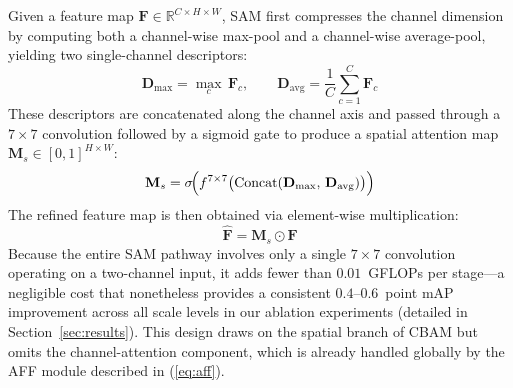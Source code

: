 Given a feature map
$\mathbf{F} \in \mathbb{R}^{C \times H \times W}$, SAM first
compresses the channel dimension by computing both a
channel-wise max-pool and a channel-wise average-pool,
yielding two single-channel descriptors:
\begin{equation}
    \mathbf{D}_{\max} = \max_{c}\, \mathbf{F}_{c},
    \qquad
    \mathbf{D}_{\text{avg}} = \frac{1}{C}
    \sum_{c=1}^{C} \mathbf{F}_{c}
    \label{eq:sam_pool}
\end{equation}
These descriptors are concatenated along the channel axis and
passed through a $7 \times 7$ convolution followed by a sigmoid
gate to produce a spatial attention map
$\mathbf{M}_{s} \in [0,1]^{H \times W}$:
\begin{equation}
    \mathbf{M}_{s} = \sigma\!\Bigl(
        f^{7 \times 7}\bigl(
            \text{Concat}(\mathbf{D}_{\max},\,
                           \mathbf{D}_{\text{avg}})
        \bigr)
    \Bigr)
    \label{eq:sam_gate}
\end{equation}
The refined feature map is then obtained via element-wise
multiplication:
\begin{equation}
    \hat{\mathbf{F}} = \mathbf{M}_{s} \odot \mathbf{F}
    \label{eq:sam_refine}
\end{equation}
Because the entire SAM pathway involves only a single
$7 \times 7$ convolution operating on a two-channel input, it
adds fewer than $0.01$~GFLOPs per stage---a negligible cost
that nonetheless provides a consistent $0.4$--$0.6$~point mAP
improvement across all scale levels in our ablation
experiments (detailed in Section~\ref{sec:results}). This
design draws on the spatial branch of CBAM
\cite{woo2018cbam} but omits the channel-attention component,
which is already handled globally by the AFF module described
in (\ref{eq:aff}).
